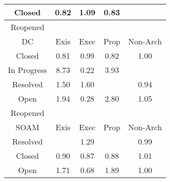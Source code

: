 \begin{tabular}{|c||c|c|c|c|}
\hline
Closed & \cellcolor[rgb]{0.8767743640882579,0.682731990017754,0.388989406482374} 0.82 & \cellcolor[rgb]{0.9057986004541518,0.8380098633730193,0.42} 1.09 & \cellcolor[rgb]{0.8785168328505021,0.6909796754923762,0.3906157106604685} 0.83 &  \\ 
\hline
Reopened &  &  &  &  \\ 
\hline
\hline
DC & Exis & Exec & Prop & Non-Arch \\ 
\hline
Closed & \cellcolor[rgb]{0.875996245246948,0.6790488941688871,0.3882631622304848} 0.81 & \cellcolor[rgb]{0.9085080195344444,0.8329379591297031,0.41860748489881466} 0.99 & \cellcolor[rgb]{0.8763389454081363,0.6806710082651782,0.38858301571426046} 0.82 & \cellcolor[rgb]{0.9098855178889856,0.8399457716316248,0.42} 1.00 \\ 
\hline
In Progress & \cellcolor[rgb]{0.53,0.66,0.42} 8.73 & \cellcolor[rgb]{0.7676390427834929,0.16615813584186656,0.28712977326459344} 0.22 & \cellcolor[rgb]{0.7662087731518644,0.7718883662298306,0.42000000000000004} 3.93 &  \\ 
\hline
Resolved & \cellcolor[rgb]{0.8854142410843147,0.8283541141978332,0.42} 1.50 & \cellcolor[rgb]{0.8803910368224575,0.8259747016527429,0.42} 1.60 &  & \cellcolor[rgb]{0.8996609842401856,0.7910619920702117,0.4103502519575065} 0.94 \\ 
\hline
Open & \cellcolor[rgb]{0.8637591829860999,0.8180964550986789,0.42} 1.94 & \cellcolor[rgb]{0.7777571870317287,0.21405068528351542,0.29657337456294675} 0.28 & \cellcolor[rgb]{0.8216162433270141,0.7981340099970067,0.42} 2.80 & \cellcolor[rgb]{0.9074340668920019,0.8387845580014746,0.42} 1.05 \\ 
\hline
Reopened &  &  &  &  \\ 
\hline
\hline
SOAM & Exis & Exec & Prop & Non-Arch \\ 
\hline
Resolved &  & \cellcolor[rgb]{0.895798609184952,0.8332730254033983,0.42} 1.29 &  & \cellcolor[rgb]{0.9076119121536197,0.8286963841938001,0.4177711180100451} 0.99 \\ 
\hline
Closed & \cellcolor[rgb]{0.8920907842336739,0.7552297120393898,0.40328473195142894} 0.90 & \cellcolor[rgb]{0.8863299514012054,0.7279617699657052,0.397907954641125} 0.87 & \cellcolor[rgb]{0.8876117103433446,0.734028762291831,0.3991042629871216} 0.88 & \cellcolor[rgb]{0.9096550833294319,0.8398366184192047,0.42} 1.01 \\ 
\hline
Open & \cellcolor[rgb]{0.8749395239154468,0.8233924060652116,0.42} 1.71 & \cellcolor[rgb]{0.8520019928556071,0.5654760995165398,0.3658685266652332} 0.68 & \cellcolor[rgb]{0.8662136283717484,0.8192590871234597,0.42} 1.89 & \cellcolor[rgb]{0.9097574178928222,0.8398850926860737,0.42} 1.00 \\ 

\end{tabular}
